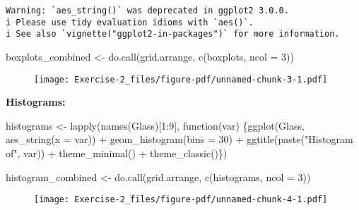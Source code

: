 \documentclass[
  letterpaper,
  DIV=11,
  numbers=noendperiod]{scrartcl}
\newenvironment{Shaded}{\begin{snugshade}}{\end{snugshade}}
\newcommand{\AttributeTok}[1]{\textcolor[rgb]{0.40,0.45,0.13}{#1}}
\newcommand{\ControlFlowTok}[1]{\textcolor[rgb]{0.00,0.23,0.31}{#1}}
\newcommand{\DecValTok}[1]{\textcolor[rgb]{0.68,0.00,0.00}{#1}}
\newcommand{\FunctionTok}[1]{\textcolor[rgb]{0.28,0.35,0.67}{#1}}
\newcommand{\NormalTok}[1]{\textcolor[rgb]{0.00,0.23,0.31}{#1}}
\newcommand{\OtherTok}[1]{\textcolor[rgb]{0.00,0.23,0.31}{#1}}
\newcommand{\SpecialCharTok}[1]{\textcolor[rgb]{0.37,0.37,0.37}{#1}}
\newcommand{\StringTok}[1]{\textcolor[rgb]{0.13,0.47,0.30}{#1}}
\begin{document}
\begin{verbatim}
Warning: `aes_string()` was deprecated in ggplot2 3.0.0.
i Please use tidy evaluation idioms with `aes()`.
i See also `vignette("ggplot2-in-packages")` for more information.
\end{verbatim}

\begin{Shaded}
\begin{Highlighting}[]
\NormalTok{boxplots\_combined }\OtherTok{\textless{}{-}} \FunctionTok{do.call}\NormalTok{(grid.arrange, }\FunctionTok{c}\NormalTok{(boxplots, }\AttributeTok{ncol =} \DecValTok{3}\NormalTok{))}
\end{Highlighting}
\end{Shaded}

\begin{figure}[H]

{\centering \texttt{[image: Exercise-2\_files/figure-pdf/unnamed-chunk-3-1.pdf]}

}

\end{figure}

\textbf{Histograms:}

\begin{Shaded}
\begin{Highlighting}[]
\NormalTok{histograms }\OtherTok{\textless{}{-}} \FunctionTok{lapply}\NormalTok{(}\FunctionTok{names}\NormalTok{(Glass)[}\DecValTok{1}\SpecialCharTok{:}\DecValTok{9}\NormalTok{], }\ControlFlowTok{function}\NormalTok{(var) \{}\FunctionTok{ggplot}\NormalTok{(Glass, }\FunctionTok{aes\_string}\NormalTok{(}\AttributeTok{x =}\NormalTok{ var)) }\SpecialCharTok{+} 
    \FunctionTok{geom\_histogram}\NormalTok{(}\AttributeTok{bins =} \DecValTok{30}\NormalTok{) }\SpecialCharTok{+} 
    \FunctionTok{ggtitle}\NormalTok{(}\FunctionTok{paste}\NormalTok{(}\StringTok{"Histogram of"}\NormalTok{, var)) }\SpecialCharTok{+} 
    \FunctionTok{theme\_minimal}\NormalTok{() }\SpecialCharTok{+}
    \FunctionTok{theme\_classic}\NormalTok{()\})}


\NormalTok{histogram\_combined }\OtherTok{\textless{}{-}} \FunctionTok{do.call}\NormalTok{(grid.arrange, }\FunctionTok{c}\NormalTok{(histograms, }\AttributeTok{ncol =} \DecValTok{3}\NormalTok{))}
\end{Highlighting}
\end{Shaded}

\begin{figure}[H]

{\centering \texttt{[image: Exercise-2\_files/figure-pdf/unnamed-chunk-4-1.pdf]}

}

\end{figure}
\end{document}
